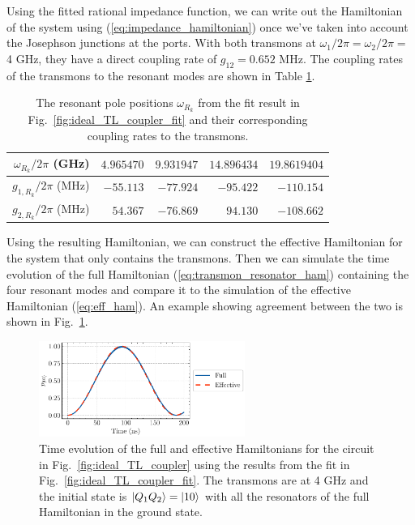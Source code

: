 Using the fitted rational impedance function, we can write out the Hamiltonian of the system using (\ref{eq:impedance_hamiltonian}) once we've taken into account the Josephson junctions at the ports. With both transmons at $\omega_1/2\pi=\omega_2/2\pi = $ 4 GHz, they have a direct coupling rate of $g_{12} = 0.652$ MHz. The coupling rates of the transmons to the resonant modes are shown in Table \ref{table:ideal_TL_coupling}.

\renewcommand{\arraystretch}{1.5}
\begin{table}[h!]
    \centering
    \begin{tabular}{|r|r|r|r|r|}
    \hline
    $\omega_{R_k}/2\pi$ (GHz) & $4.965470$   & $9.931947$   & $14.896434$  & $19.8619404$ \\ \hline
    $g_{1,R_k}/2\pi$ (MHz)   & $-55.113$ & $-77.924$ & $-95.422$ & $-110.154$ \\ \hline
    $g_{2,R_k}/2\pi$ (MHz)   & $54.367$  & $-76.869$ & $94.130$  & $-108.662$ \\ \hline
\end{tabular}
\caption{The resonant pole positions $\omega_{R_k}$ from the fit result in Fig.\ \ref{fig:ideal_TL_coupler_fit} and their corresponding coupling rates to the transmons.}
\label{table:ideal_TL_coupling}
\end{table}
\renewcommand{\arraystretch}{1}

Using the resulting Hamiltonian, we can construct the effective Hamiltonian for the system that only contains the transmons. Then we can simulate the time evolution of the full Hamiltonian (\ref{eq:transmon_resonator_ham}) containing the four resonant modes and compare it to the simulation of the effective Hamiltonian (\ref{eq:eff_ham}). An example showing agreement between the two is shown in Fig.\ \ref{fig:ideal_TL_coupler_sim}.

\begin{figure}[!h]
    \centering
    \includegraphics[width=0.6\textwidth]{figures/ideal_TL_sim.pdf}
    \caption{Time evolution of the full and effective Hamiltonians for the circuit in Fig.\ \ref{fig:ideal_TL_coupler} using the results from the fit in Fig.\ \ref{fig:ideal_TL_coupler_fit}. The transmons are at 4 GHz and the initial state is $\ket{Q_1Q_2}=\ket{10}$ with all the resonators of the full Hamiltonian in the ground state.}
    \label{fig:ideal_TL_coupler_sim}
\end{figure}

